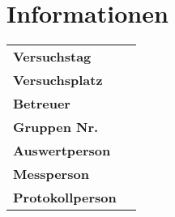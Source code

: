 \restoregeometry

\chapter*{Informationen}
\label{chap:info}

\begin{tabular}{l l}

	{\textbf{Versuchstag}} \hspace{1cm} & \hspace{1cm} {\datum}\\[0,2cm]
	{\textbf{Versuchsplatz}} \hspace{1cm} & \hspace{1cm} {\platz}\\[0,2cm]
	{\textbf{Betreuer}} \hspace{1cm} & \hspace{1cm} {\betreuer}\\[1,2cm]
	{\textbf{Gruppen Nr.}} \hspace{1cm} & \hspace{1cm} {\groupnr}\\[0.2cm]
	{\textbf{Auswertperson}} \hspace{1cm} & \hspace{1cm} {\auswertp}\\[0.2cm]
	{\textbf{Messperson}} \hspace{1cm} & \hspace{1cm} {\messp}\\[0.2cm]
	{\textbf{Protokollperson}} \hspace{1cm} & \hspace{1cm} {\protop}\\[0.2cm]

\end{tabular}